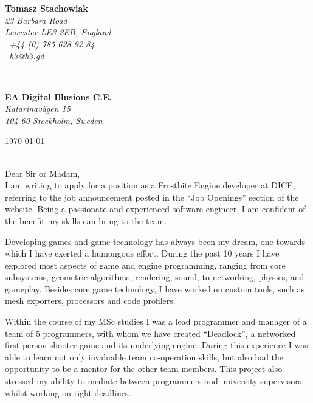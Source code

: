 \documentclass[11pt]{article}
\begin{document}
\hfill%
\begin{minipage}[t]{.6\textwidth}
\raggedleft%
{\bfseries Tomasz Stachowiak}\\[.35ex]
\small\itshape%
23 Barbara Road\\
Leicester LE3 2EB, England\\[.35ex]
\Telefon~+44 (0) 785 628 92 84\\
\Letter~\href{mailto:h3@h3.gd}{h3@h3.gd}
\end{minipage}\\[1em]
%
\begin{minipage}[t]{.4\textwidth}
\raggedright%
{\bfseries EA Digital Illusions C.E.}\\[.35ex]
\small\itshape%
Katarinavägen 15\\
104 60 Stockholm, Sweden
\end{minipage}
\hfill %
\begin{minipage}[t]{.4\textwidth}
\raggedleft %
\today
\end{minipage}\\[2em]
Dear Sir or Madam,\\[1.5em]
%
I am writing to apply for a position as a Frostbite Engine developer at DICE, referring to the job announcement posted in the ``Job Openings'' section of the website. Being a passionate and experienced software engineer, I am confident of the benefit my skills can bring to the team.

Developing games and game technology has always been my dream, one towards which I have exerted a humongous effort. During the past 10 years I have explored most aspects of game and engine programming, ranging from core subsystems, geometric algorithms, rendering, sound, to networking, physics, and gameplay. Besides core game technology, I have worked on custom tools, such as mesh exporters, processors and code profilers.

Within the course of my MSc studies I was a lead programmer and manager of a team of 5 programmers, with whom we have created ``Deadlock'', a networked first person shooter game and its underlying engine. During this experience I was able to learn not only invaluable team co-operation skills, but also had the opportunity to be a mentor for the other team members. This project also stressed my ability to mediate between programmers and university supervisors, whilst working on tight deadlines.
\end{document}
